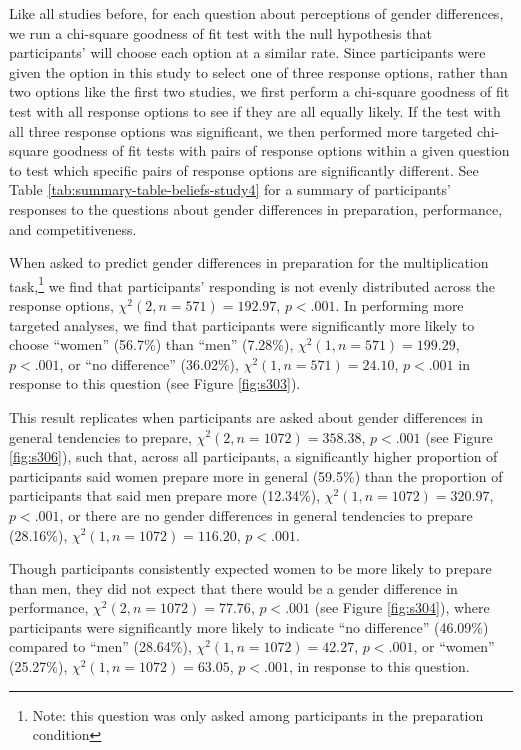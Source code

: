 \documentclass[letterpaper, nobind]{templates/ociamthesis}
\begin{document}
Like all studies before, for each question about perceptions of gender differences, we run a chi-square goodness of fit test with the null hypothesis that participants' will choose each option at a similar rate. Since participants were given the option in this study to select one of three response options, rather than two options like the first two studies, we first perform a chi-square goodness of fit test with all response options to see if they are all equally likely. If the test with all three response options was significant, we then performed more targeted chi-square goodness of fit tests with pairs of response options within a given question to test which specific pairs of response options are significantly different. See Table \ref{tab:summary-table-beliefs-study4} for a summary of participants' responses to the questions about gender differences in preparation, performance, and competitiveness.

When asked to predict gender differences in preparation for the multiplication task,\footnote{Note: this question was only asked among participants in the preparation condition} we find that participants' responding is not evenly distributed across the response options, \(\chi^2(2, n = 571) = 192.97\), \(p < .001\). In performing more targeted analyses, we find that participants were significantly more likely to choose ``women'' (56.7\%) than ``men'' (7.28\%), \(\chi^2(1, n = 571) = 199.29\), \(p < .001\), or ``no difference'' (36.02\%), \(\chi^2(1, n = 571) = 24.10\), \(p < .001\) in response to this question (see Figure \ref{fig:s303}).

This result replicates when participants are asked about gender differences in general tendencies to prepare, \(\chi^2(2, n = 1072) = 358.38\), \(p < .001\) (see Figure \ref{fig:s306}), such that, across all participants, a significantly higher proportion of participants said women prepare more in general (59.5\%) than the proportion of participants that said men prepare more (12.34\%), \(\chi^2(1, n = 1072) = 320.97\), \(p < .001\), or there are no gender differences in general tendencies to prepare (28.16\%), \(\chi^2(1, n = 1072) = 116.20\), \(p < .001\).

Though participants consistently expected women to be more likely to prepare than men, they did not expect that there would be a gender difference in performance, \(\chi^2(2, n = 1072) = 77.76\), \(p < .001\) (see Figure \ref{fig:s304}), where participants were significantly more likely to indicate ``no difference'' (46.09\%) compared to ``men'' (28.64\%), \(\chi^2(1, n = 1072) = 42.27\), \(p < .001\), or ``women'' (25.27\%), \(\chi^2(1, n = 1072) = 63.05\), \(p < .001\), in response to this question.
\end{document}
